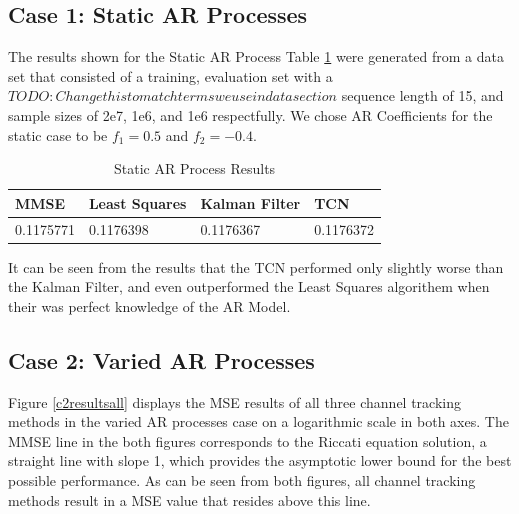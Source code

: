 \documentclass[twocolumn,letterpaper]{IEEEAerospaceCLS}  %
\begin{document}
\subsection{Case 1: Static AR Processes}

The results shown for the Static AR Process Table \ref{tab:staticARResults} were generated from a data set that consisted of a training, evaluation set with a $TODO: Change this to 
match terms we use in data section$ sequence length of 15, and sample sizes of 2e7, 1e6, and 1e6 respectfully. 
We chose AR Coefficients for the static case to be $f_1 = 0.5$ and $f_2 = -0.4$.  

\begin{table}[!h]
	\begin{tabular}{|l|l|l|l|}
		\hline
		 MMSE                 & Least Squares        & Kalman Filter         & TCN                   \\ \hline
		\multirow{3}{*}{0.1175771} & \multirow{3}{*}{0.1176398} & \multirow{3}{*}{0.1176367} & \multirow{3}{*}{0.1176372} \\
		                      &                      &                       &                       \\
		                      &                      &                       &                       \\ \hline
	\end{tabular}
	\caption{Static AR Process Results}
	\label{tab:staticARResults}
\end{table}

It can be seen from the results that the TCN performed only slightly worse than the Kalman Filter, and even outperformed the Least Squares algorithem when their was perfect knowledge of the AR Model.

\newpage

\subsection{Case 2: Varied AR Processes}

Figure \ref{c2resultsall} displays the MSE results of all three channel tracking methods in the varied AR processes case on a logarithmic scale in both axes. The MMSE line in the both figures corresponds to the Riccati equation solution, a straight line with slope 1, which provides the asymptotic lower bound for the best possible performance. As can be seen from both figures, all channel tracking methods result in a MSE value that resides above this line. 
\end{document}
